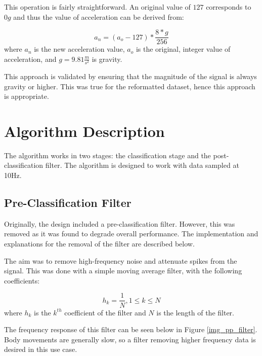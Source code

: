             This operation is fairly straightforward. An original value of $127$ corresponds to $0g$ and thus the value of acceleration can be derived from:

            \begin{equation}
                a_n = (a_o - 127)*\frac{8*g}{256}
            \end{equation}
            where $a_n$ is the new acceleration value, $a_o$ is the original, integer value of acceleration, and $g=9.81\frac{m}{s^2}$ is gravity.

            This approach is validated by ensuring that the magnitude of the signal is always gravity or higher. This was true for the reformatted dataset, hence this approach is appropriate.



    \chapter{Algorithm Description}

        The algorithm works in two stages: the classification stage and the post-classification filter. The algorithm is designed to work with data sampled at 10Hz. 

        \section{Pre-Classification Filter}

            Originally, the design included a pre-classification filter. However, this was removed as it was found to degrade overall performance. The implementation and explanations for the removal of the filter are described below.

            The aim was to remove high-frequency noise and attenuate spikes from the signal. This was done with a simple moving average filter, with the following coefficients:

            \begin{equation}
                h_k = \frac{1}{N}, 1\leq k\leq N
            \end{equation}
            where $h_k$ is the $k^{th}$ coefficient of the filter and $N$ is the length of the filter.

            The frequency response of this filter can be seen below in Figure \ref{img_pp_filter}. Body movements are generally slow, so a filter removing higher frequency data is desired in this use case.

